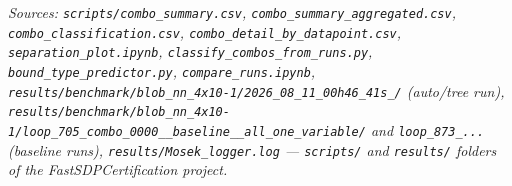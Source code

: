 \documentclass[11pt,a4paper]{article}
\begin{document}
\vspace{1em}
{\small\itshape\color{black!55} Sources: \texttt{scripts/combo\_summary.csv}, \texttt{combo\_summary\_aggregated.csv}, \texttt{combo\_classification.csv}, \texttt{combo\_detail\_by\_datapoint.csv}, \texttt{separation\_plot.ipynb}, \texttt{classify\_combos\_from\_runs.py}, \texttt{bound\_type\_predictor.py}, \texttt{compare\_runs.ipynb}, \texttt{results/benchmark/blob\_nn\_4x10-1/2026\_08\_11\_00h46\_41s\_/} (auto/tree run), \texttt{results/benchmark/blob\_nn\_4x10-1/loop\_705\_combo\_0000\_\_baseline\_\_all\_one\_variable/} and \texttt{loop\_873\_...} (baseline runs), \texttt{results/Mosek\_logger.log} --- \texttt{scripts/} and \texttt{results/} folders of the FastSDPCertification project.}
\end{document}
